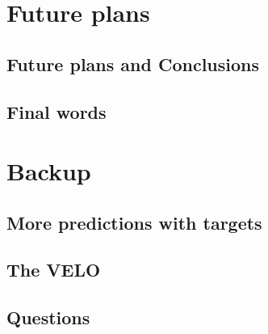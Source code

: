 \documentclass[aspectratio=169, 10pt]{beamer}
\begin{document}

\section{Future plans}

\subsection{Future plans and Conclusions}


\subsection{Final words}




\backupbegin

\section{Backup}

\subsection{More predictions with targets}


\subsection{The VELO}


\subsection{Questions}




\backupend
\end{document}
